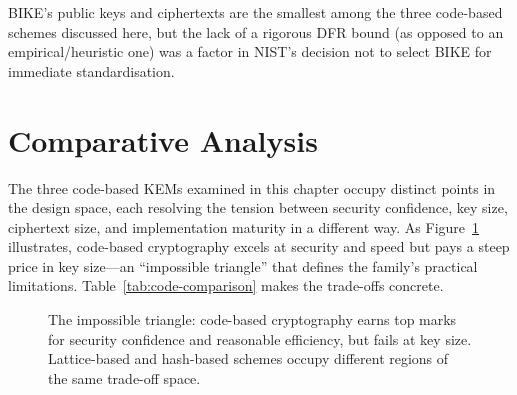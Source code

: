 BIKE's public keys and ciphertexts are the smallest among the three code-based schemes discussed here, but the lack of a rigorous DFR bound (as opposed to an empirical/heuristic one) was a factor in NIST's decision not to select BIKE for immediate standardisation.


\section{Comparative Analysis}
\label{sec:code-comparison}

The three code-based KEMs examined in this chapter occupy distinct points in the design space, each resolving the tension between security confidence, key size, ciphertext size, and implementation maturity in a different way.  As Figure~\ref{fig:ch09-impossible-triangle} illustrates, code-based cryptography excels at security and speed but pays a steep price in key size---an ``impossible triangle'' that defines the family's practical limitations.  Table~\ref{tab:code-comparison} makes the trade-offs concrete.

\begin{figure}[t]
\centering
{}
\caption{The impossible triangle: code-based cryptography earns top marks for security confidence and reasonable efficiency, but fails at key size.  Lattice-based and hash-based schemes occupy different regions of the same trade-off space.}
\label{fig:ch09-impossible-triangle}
\end{figure}


